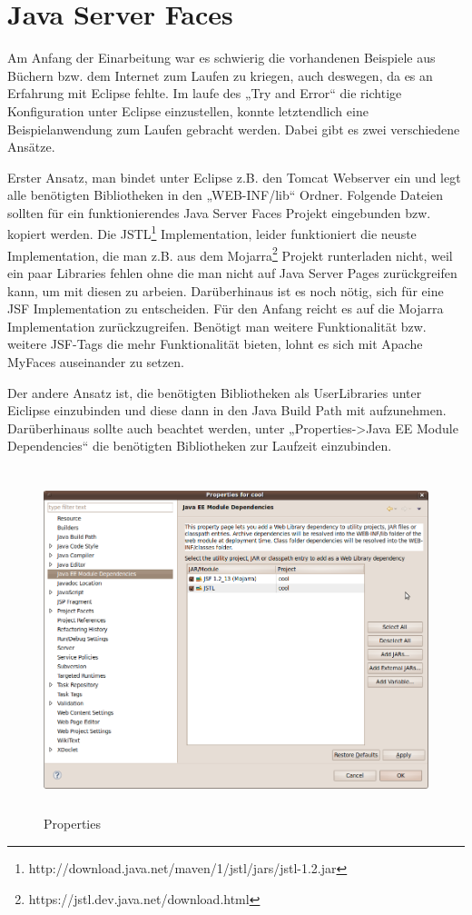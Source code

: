 \documentclass[titlepage, 12pt,a4paper]{scrartcl}
\begin{document}
\section{Java Server Faces}
Am Anfang der Einarbeitung war es schwierig die vorhandenen Beispiele aus
Büchern bzw. dem Internet zum Laufen zu kriegen, auch deswegen, da es an
Erfahrung mit Eclipse fehlte. Im laufe des „Try and Error“ die richtige
Konfiguration unter Eclipse einzustellen, konnte letztendlich eine
Beispielanwendung zum Laufen gebracht werden. Dabei gibt es zwei verschiedene
Ansätze. 

Erster Ansatz, man bindet unter Eclipse z.B. den Tomcat Webserver ein und legt
alle benötigten Bibliotheken in den „WEB-INF/lib“ Ordner. Folgende Dateien
sollten für ein funktionierendes Java Server Faces Projekt eingebunden
bzw. kopiert werden. Die
JSTL\footnote{http://download.java.net/maven/1/jstl/jars/jstl-1.2.jar} Implementation, leider funktioniert die neuste Implementation, die man z.B. aus
dem Mojarra\footnote{https://jstl.dev.java.net/download.html} Projekt
runterladen nicht, weil ein paar Libraries fehlen ohne die man nicht auf Java
Server Pages zurückgreifen kann, um mit diesen zu arbeien. Darüberhinaus ist es
noch nötig, sich für eine JSF Implementation zu entscheiden. Für den Anfang
reicht es auf die Mojarra Implementation zurückzugreifen. Benötigt man weitere
Funktionalität bzw. weitere JSF-Tags die mehr Funktionalität bieten, lohnt es
sich mit Apache MyFaces auseinander zu setzen. 

Der andere Ansatz ist, die benötigten Bibliotheken als UserLibraries unter
Eiclipse einzubinden und diese dann in den Java Build Path mit aufzunehmen.
Darüberhinaus sollte auch beachtet werden, unter „Properties->Java EE
Module Dependencies“ die benötigten Bibliotheken zur Laufzeit einzubinden.



\begin{figure}[h]
\begin{center}
\includegraphics[width=15cm, height=10cm]{bilder/Properties.png}
\caption{Properties}
\label{properties}
\end{center}
\end{figure}
\end{document}
